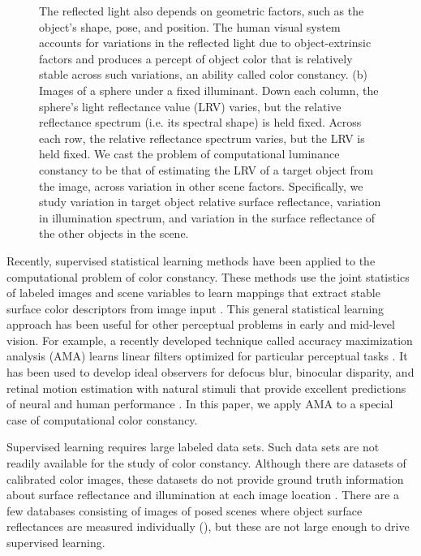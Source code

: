 \documentclass{jov}
\begin{document}
\begin{figure}
{The reflected light also depends on geometric factors, such as the object's shape, pose, and position. 
The human visual system accounts for variations in the reflected light due to object-extrinsic factors and produces a percept of object color that is relatively stable across such variations, an ability called color constancy. 
(b) Images of a sphere under a fixed illuminant.  
Down each column, the sphere's light reflectance value (LRV) varies, but the relative reflectance spectrum (i.e. its spectral shape) is held fixed.
Across each row, the relative reflectance spectrum varies, but the LRV is held fixed.
We cast the problem of computational luminance constancy to be that of estimating the LRV of a target object from the image, across variation in other scene factors. 
Specifically, we study variation in target object relative surface reflectance, variation in illumination spectrum, and variation in the surface reflectance of the other objects in the scene.}
 \end{figure}

Recently, supervised statistical learning methods have been applied to the computational problem of color constancy.
These methods use the joint statistics of labeled images and scene variables to learn mappings that extract stable surface color descriptors from image input \cite{barron2015convolutional}.
This general statistical learning approach has been useful for other perceptual problems in early and mid-level vision.
For example, a recently developed technique called accuracy maximization analysis (AMA) learns linear filters optimized for particular perceptual tasks \cite{geisler2009optimal,burge2017accuracy,jaini2017linking}. It has been used to develop ideal observers for defocus blur, binocular disparity, and retinal motion estimation with natural stimuli that provide excellent predictions of neural and human performance \cite{burge2011optimal, burge2012optimal, burge2014optimal, burge2015optimal}.
In this paper, we apply AMA to a special case of computational color constancy. 

Supervised learning requires large labeled data sets.  Such data sets are not readily available for the study of color constancy. Although there are datasets of calibrated color images, these datasets do not provide ground truth information about surface reflectance and illumination at each image location \cite{ChakrabartiHyperspectral,NascimentoFoster2016,ParragaHyperspectralData,TkacikUpennHypersepctralData,skauli2013collection,olmos2004biologically}. There are a few databases consisting of images of posed scenes where object surface reflectances are measured individually (), but these are not large enough to drive supervised learning.
 
\end{document}
